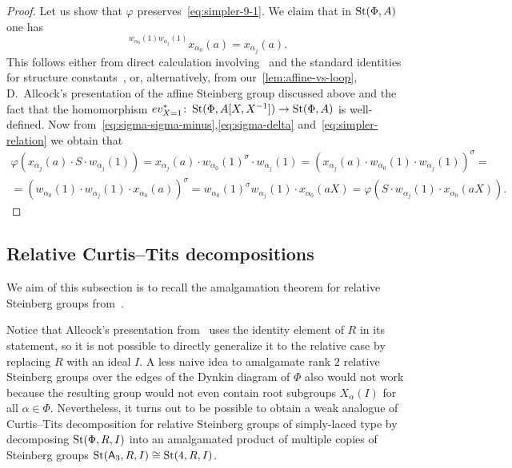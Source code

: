 \begin{proof}
 Let us show that $\varphi$ preserves~\eqref{eq:simpler-9-1}.
 We claim that in $\operatorname{St}(\Phi, A)$ one has
 \begin{equation} \label{eq:simpler-relation} {}^{w_{\alpha_0}(1) w_{\alpha_j}(1)} x_{\alpha_0}(a) = x_{\alpha_j}(a). \end{equation}
 This follows either from direct calculation involving~\cite[Lemma~5.1]{Ma69} and the standard identities for structure constants~\cite[\S~14]{VP},
 or, alternatively, from our~\cref{lem:affine-vs-loop}, D.~Allcock's presentation of the affine Steinberg group discussed above and
 the fact that the homomorphism $ev_{X=1}^*\colon \operatorname{St}(\Phi, A[X, X^{-1}]) \to \operatorname{St}(\Phi, A)$ is well-defined.
 Now from~\eqref{eq:sigma-sigma-minus},\eqref{eq:sigma-delta} and~\eqref{eq:simpler-relation} we obtain that
 \begin{multline*}
     \varphi(x_{\alpha_j}(a) \cdot S \cdot w_{\alpha_j}(1)) = x_{\alpha_j}(a) \cdot w_{\alpha_0}(1)^\sigma \cdot w_{\alpha_j}(1) = \left(x_{\alpha_j}(a) \cdot w_{\alpha_0}(1) \cdot w_{\alpha_j}(1)\right)^\sigma = \\
     = \left(w_{\alpha_0}(1) \cdot w_{\alpha_j}(1) \cdot x_{\alpha_0}(a)\right)^\sigma = w_{\alpha_0}(1)^\sigma w_{\alpha_j}(1) \cdot x_{\alpha_0}(aX) = \varphi(S \cdot w_{\alpha_j}(1) \cdot x_{\alpha_0}(aX)).
 \end{multline*}
\end{proof}

\subsection{Relative Curtis--Tits decompositions}
We aim of this subsection is to recall the amalgamation theorem for relative Steinberg groups from~\cite{S15}.

Notice that Allcock's presentation from~\cite{A16, A13} uses the identity element of $R$ in its statement,
 so it is not possible to directly generalize it to the relative case by replacing $R$ with an ideal $I$.
A less naive idea to amalgamate rank $2$ relative Steinberg groups over the edges of the Dynkin diagram of $\Phi$ also would not work
 because the resulting group would not even contain root subgroups $X_\alpha(I)$ for all $\alpha \in \Phi$.
Nevertheless, it turns out to be possible to obtain a weak analogue of Curtis--Tits decomposition for relative Steinberg groups of simply-laced type
 by decomposing $\operatorname{St}(\Phi, R, I)$ into an amalgamated product of multiple copies of Steinberg groups $\operatorname{St}(\mathsf{A}_3, R, I) \cong \operatorname{St}(4, R, I)$.


